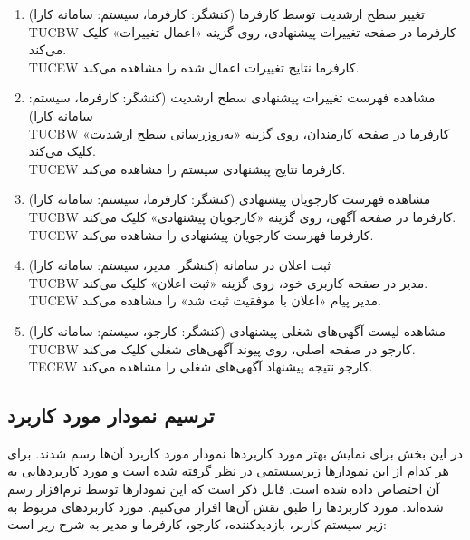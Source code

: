 \documentclass[12pt]{article}
\begin{document}
\begin{enumerate}
		\item
		تغییر سطح ارشدیت توسط کارفرما (کنشگر: کارفرما، سیستم: سامانه کارا)\\
		TUCBW کارفرما در صفحه تغییرات پیشنهادی، روی گزینه «اعمال تغییرات» کلیک می‌کند.\\
		TUCEW کارفرما نتایج تغییرات اعمال شده را مشاهده می‌کند.\\

		\item
		مشاهده فهرست تغییرات پیشنهادی سطح ارشدیت (کنشگر: کارفرما، سیستم: سامانه کارا)\\
		TUCBW کارفرما در صفحه کارمندان، روی گزینه «به‌روزرسانی سطح ارشدیت» کلیک می‌کند.\\
		TUCEW کارفرما نتایج پیشنهادی سیستم را مشاهده می‌کند.\\

		\item
		مشاهده فهرست کارجویان پیشنهادی (کنشگر: کارفرما، سیستم: سامانه کارا)\\
		TUCBW کارفرما در صفحه آگهی، روی گزینه «کارجویان پیشنهادی» کلیک می‌کند.\\
		TUCEW کارفرما فهرست کارجویان پیشنهادی را مشاهده می‌کند.\\

		\item
		ثبت اعلان در سامانه (کنشگر: مدیر، سیستم: سامانه کارا)\\
		TUCBW مدیر در صفحه کاربری خود، روی گزینه «ثبت اعلان» کلیک می‌کند.\\
		TUCEW مدیر پیام «اعلان با موفقیت ثبت شد» را مشاهده می‌کند.\\

		\item
		مشاهده لیست آگهی‌های شغلی پیشنهادی (کنشگر: کارجو، سیستم: سامانه کارا)\\
		TUCBW کارجو در صفحه اصلی، روی پیوند آگهی‌های شغلی کلیک می‌کند.\\
		TECEW کارجو نتیجه پیشنهاد آگهی‌های شغلی را مشاهده می‌کند.\\
	\end{enumerate}

	\subsection{ترسیم نمودار مورد کاربرد}
	در این بخش برای نمایش بهتر مورد کاربردها نمودار مورد کاربرد آن‌ها رسم شدند. برای هر کدام از این نمودارها زیرسیستمی در نظر گرفته شده است و مورد کاربرد‌هایی به آن اختصاص داده شده است. قابل ذکر است که این نمودارها توسط نرم‌افزار
	رسم شده‌اند. مورد کاربرد‌ها را طبق نقش آن‌ها افراز می‌کنیم. مورد کاربردهای مربوط به زیر سیستم کاربر، بازدیدکننده، کارجو، کارفرما و مدیر به شرح زیر است:
\end{document}
